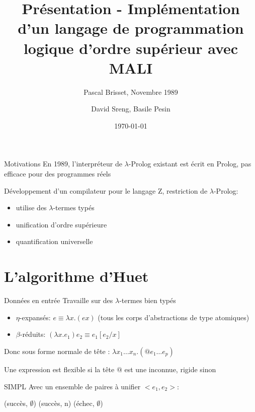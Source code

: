 \documentclass[aspectratio=169]{beamer}
\title{Présentation - Implémentation d’un langage de programmation logique d’ordre supérieur avec MALI}
\subtitle{Pascal Brisset, Novembre 1989}
\date{\today}
\author{David Sreng, Basile Pesin}
\institute{Faculté des Sciences de Sorbonne Université}
\begin{document}

\lstset{basicstyle=\tt\footnotesize, frame=single}

\maketitle

\begin{frame}{Motivations}
  En 1989, l'interpréteur de $\lambda$-Prolog existant est écrit en Prolog, pas efficace pour des programmes réels

  Développement d'un compilateur pour le langage Z, restriction de $\lambda$-Prolog:
  \begin{itemize}
    \item utilise des $\lambda$-termes typés
    \item unification d'ordre supérieure
    \item quantification universelle
  \end{itemize}
\end{frame}

\section{L'algorithme d'Huet}

\begin{frame}{Données en entrée}
  Travaille sur des $\lambda$-termes bien typés
  \begin{itemize}
    \item $\eta$-expansés: $e \equiv \lambda x.(e x)$ (tous les corps d'abstractions de type atomiques)
    \item $\beta$-réduits: $(\lambda x . e_1) e_2 \equiv e_1[e_2/x]$
  \end{itemize}
  Donc sous forme normale de tête : $\lambda x_1 \ldots x_n . (@ e_1 \ldots e_p)$

  Une expression est flexible si la tête $@$ est une inconnue, rigide sinon
\end{frame}

\begin{frame}{SIMPL}
  Avec un ensemble de paires à unifier $<e_1, e_2>$:
  \begin{algorithmic}
     (succès, $\emptyset$)
    \EndIf
     (succès, n)
    \EndIf
     (échec, $\emptyset$)
    \Else
    \EndIf
    \EndIf
    \EndProcedure
  \end{algorithmic}
\end{frame}
\end{document}
